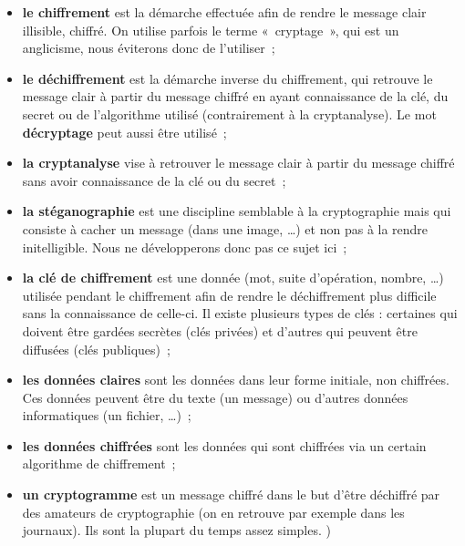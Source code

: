 \begin{itemize}

\item {\sffamily\textbf{le chiffrement}} est la démarche effectuée afin de rendre
  le message clair illisible, chiffré. On utilise parfois le terme
  «~cryptage~», qui est un anglicisme, nous éviterons donc de
  l'utiliser~;

\item {\sffamily\textbf{le déchiffrement}} est la démarche inverse du chiffrement, qui retrouve
  le message clair à partir du message chiffré en ayant connaissance
  de la clé, du secret ou de l'algorithme utilisé (contrairement à la
  cryptanalyse). Le mot {\sffamily\textbf{décryptage}} peut aussi
être utilisé~;
\item {\sffamily\textbf{la cryptanalyse}} vise à retrouver le
message clair à partir du message chiffré sans avoir connaissance
de la clé ou du secret~;

\item {\sffamily\textbf{la stéganographie}} est une discipline semblable à la
  cryptographie mais qui consiste à cacher un message (dans une
  image, \dots) et non pas à la rendre initelligible. Nous ne
développerons donc pas ce sujet ici~;

\item {\sffamily\textbf{la clé de chiffrement}} est une donnée (mot, suite d'opération,
  nombre, \dots) utilisée pendant le chiffrement afin de rendre le
  déchiffrement plus difficile sans la connaissance de celle-ci. Il
  existe plusieurs types de clés : certaines qui doivent être gardées
  secrètes (clés privées) et d'autres qui peuvent être diffusées
  (clés publiques)~;

\item {\sffamily\textbf{les données claires}} sont les données dans leur forme initiale, non
  chiffrées. Ces données peuvent être du texte (un message) ou d'autres
  données informatiques (un fichier, \dots)~;

\item {\sffamily\textbf{les données chiffrées}} sont les données qui
sont chiffrées via un certain
  algorithme de chiffrement~;

\item {\sffamily\textbf{un cryptogramme}} est un message chiffré
dans le but d'être déchiffré par des amateurs de cryptographie (on
en retrouve par exemple dans les journaux). Ils sont la plupart du
temps assez simples.
)
\end{itemize}
